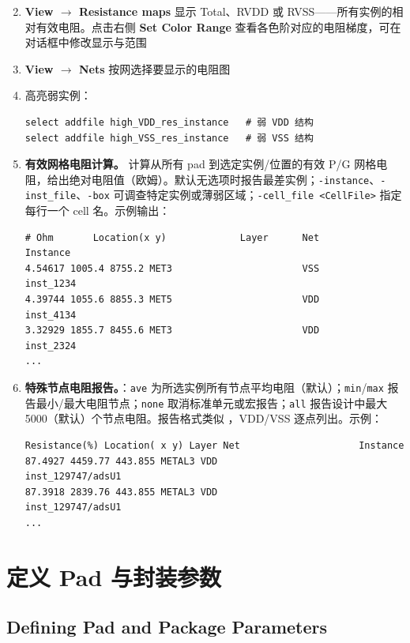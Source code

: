 \begin{enumerate}
\setcounter{enumi}{1}
  \item \textbf{View $\rightarrow$ Resistance maps} 显示 Total、RVDD 或 RVSS——所有实例的相对有效电阻。点击右侧 \textbf{Set Color Range} 查看各色阶对应的电阻梯度，可在对话框中修改显示与范围
  \item \textbf{View $\rightarrow$ Nets} 按网选择要显示的电阻图
  \item 高亮弱实例：
\begin{lstlisting}
select addfile high_VDD_res_instance   # 弱 VDD 结构
select addfile high_VSS_res_instance   # 弱 VSS 结构
\end{lstlisting}
  \item \textbf{有效网格电阻计算。} 计算从所有 pad 到选定实例/位置的有效 P/G 网格电阻，给出绝对电阻值（欧姆）。默认无选项时报告最差实例；\texttt{-instance}、\texttt{-inst_file}、\texttt{-box} 可调查特定实例或薄弱区域；\texttt{-cell\_file <CellFile>} 指定每行一个 cell 名。示例输出：
\begin{lstlisting}
# Ohm       Location(x y)             Layer      Net         Instance
4.54617 1005.4 8755.2 MET3                       VSS         inst_1234
4.39744 1055.6 8855.3 MET5                       VDD         inst_4134
3.32929 1855.7 8455.6 MET3                       VDD         inst_2324
...
\end{lstlisting}
  \item \textbf{特殊节点电阻报告。}：\texttt{ave} 为所选实例所有节点平均电阻（默认）；\texttt{min}/\texttt{max} 报告最小/最大电阻节点；\texttt{none} 取消标准单元或宏报告；\texttt{all} 报告设计中最大 5000（默认）个节点电阻。报告格式类似 ，VDD/VSS 逐点列出。示例：
\begin{lstlisting}
Resistance(%) Location( x y) Layer Net                     Instance
87.4927 4459.77 443.855 METAL3 VDD                       inst_129747/adsU1
87.3918 2839.76 443.855 METAL3 VDD                       inst_129747/adsU1
...
\end{lstlisting}
\end{enumerate}

\section{定义 Pad 与封装参数}
\subsection*{Defining Pad and Package Parameters}

